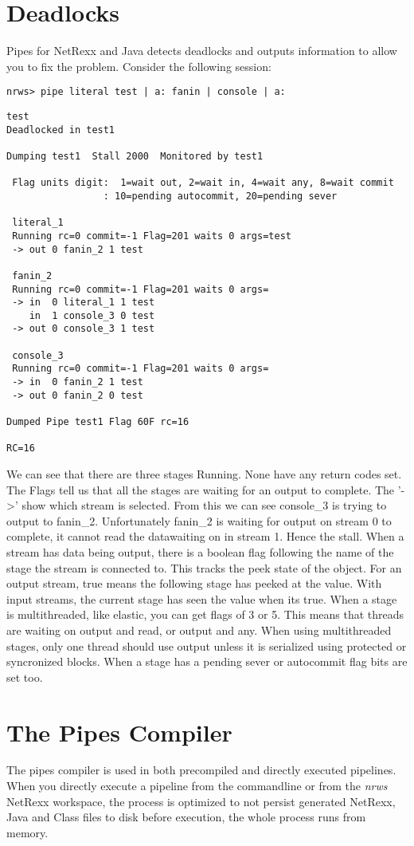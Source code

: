 \chapter{Deadlocks}
Pipes for NetRexx and Java detects deadlocks and outputs information to allow you to fix the problem.  Consider the following session:
\begin{lstlisting}
nrws> pipe literal test | a: fanin | console | a:
\end{lstlisting}
\begin{verbatim}
test
Deadlocked in test1

Dumping test1  Stall 2000  Monitored by test1

 Flag units digit:  1=wait out, 2=wait in, 4=wait any, 8=wait commit
                 : 10=pending autocommit, 20=pending sever

 literal_1
 Running rc=0 commit=-1 Flag=201 waits 0 args=test
 -> out 0 fanin_2 1 test

 fanin_2
 Running rc=0 commit=-1 Flag=201 waits 0 args=
 -> in  0 literal_1 1 test
    in  1 console_3 0 test
 -> out 0 console_3 1 test

 console_3
 Running rc=0 commit=-1 Flag=201 waits 0 args=
 -> in  0 fanin_2 1 test
 -> out 0 fanin_2 0 test

Dumped Pipe test1 Flag 60F rc=16

RC=16
\end{verbatim}

We can see that there are three stages Running.  None have any return codes set.  The Flags tell us that all the stages are waiting for an output to complete.  The '->' show which stream is selected.  From this we can see console\_3 is trying to output to fanin\_2. Unfortunately fanin\_2 is waiting for output on stream 0 to complete, it cannot read the datawaiting on in stream 1.  Hence the stall.
When a stream has data being output, there is a boolean flag following the name of the stage the stream is connected to. This tracks the peek state of the object.  For an output stream, true means the following stage has peeked at the value. With input streams, the current stage has seen the value when its true.
When a stage is multithreaded, like elastic, you can get flags of 3 or 5. This means that threads are waiting on output and read, or output and any. When using multithreaded stages, only one thread should use output unless it is serialized using protected or syncronized blocks.
When a stage has a pending sever or autocommit flag bits are set too.

\chapter{The Pipes Compiler}
The pipes compiler is used in both precompiled and directly executed
pipelines. When you directly execute a pipeline from the commandline
or from the \emph{nrws} NetRexx workspace, the process is optimized to not persist
generated NetRexx, Java and Class files to disk before execution, the
whole process runs from memory.

